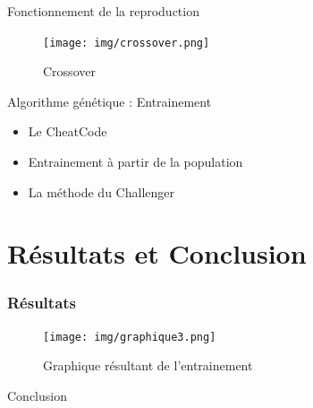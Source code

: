 \documentclass{beamer}
\begin{document}
\begin{frame}{Fonctionnement de la reproduction}
    \begin{figure}
        \centering
        \texttt{[image: img/crossover.png]}
        \caption{Crossover}
    \end{figure}
\end{frame}

\begin{frame}{Algorithme génétique : Entrainement}
    \begin{itemize}
        \item Le CheatCode
        \item Entrainement à partir de la population
        \item La méthode du Challenger
    \end{itemize}
\end{frame}

\section{Résultats et Conclusion}
\begin{frame}
    \frametitle{Résultats}
    \begin{figure}
        \centering
        \texttt{[image: img/graphique3.png]}
        \caption{Graphique résultant de l'entrainement}
    \end{figure}
\end{frame}

\begin{frame}{}
    \begin{center}
        \Huge Conclusion
    \end{center}
\end{frame}
\end{document}
